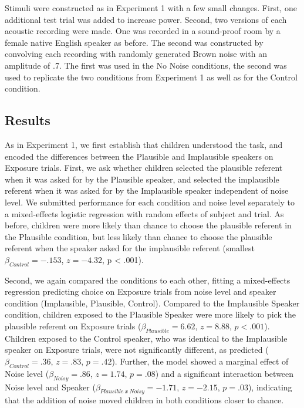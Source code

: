 \documentclass[man,floatsintext]{apa6}
\begin{document}
Stimuli were constructed as in Experiment 1 with a few small changes. First, one additional test trial was added to increase power. Second, two versions of each acoustic recording were made. One was recorded in a sound-proof room by a female native English speaker as before. The second was constructed by convolving each recording with randomly generated Brown noise with an amplitude of .7. The first was used in the No Noise conditions, the second was used to replicate the two conditions from Experiment 1 as well as for the Control condition.

\subsection{Results}

As in Experiment 1, we first establish that children understood the task, and encoded the differences between the Plausible and Implausible speakers on Exposure trials. First, we ask whether children selected the plausible referent when it was asked for by the Plausible speaker, and selected the implausible referent when it was asked for by the Implausible speaker independent of noise level. We submitted performance for each condition and noise level separately to a mixed-effects logistic regression with random effects of subject and trial. As before, children were more likely than chance to choose the plausible referent in the Plausible condition, but less likely than chance to choose the plausible referent when the speaker asked for the implausible referent (smallest $\beta_{Control} = -.153$, $z = -4.32$, p < .001). 

Second, we again compared the conditions to each other, fitting a mixed-effects regression predicting choice on Exposure trials from noise level and speaker condition (Implausible, Plausible, Control). Compared to the Implausible Speaker condition, children exposed to the Plausible Speaker were more likely to pick the plausible referent on Exposure trials ($\beta_{Plausible} = 6.62$,  $z = 8.88$, $p <.001$). Children exposed to the Control speaker, who was identical to the Implausible speaker on Exposure trials, were not significantly different, as predicted ($\beta_{Control} = .36$,  $z = .83$, $p = .42$). Further, the model showed a marginal effect of Noise level ($\beta_{Noisy} = .86$,  $z = 1.74$, $p = .08$) and a significant interaction between Noise level and Speaker ($\beta_{Plausible \: x \: Noisy} = -1.71$, $z= -2.15$, $p = .03$), indicating that the addition of noise moved children in both conditions closer to chance.
\end{document}
